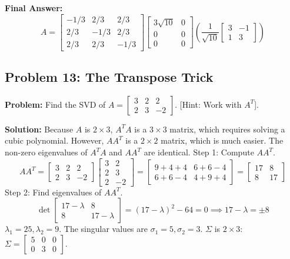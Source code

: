 \documentclass[11pt, letterpaper]{article}
\theoremstyle{definition}
\theoremstyle{remark}
\begin{document}
\textbf{Final Answer:}
\[
A = \begin{bmatrix} -1/3 & 2/3 & 2/3 \\ 2/3 & -1/3 & 2/3 \\ 2/3 & 2/3 & -1/3 \end{bmatrix} \begin{bmatrix} 3\sqrt{10} & 0 \\ 0 & 0 \\ 0 & 0 \end{bmatrix} \left( \frac{1}{\sqrt{10}} \begin{bmatrix} 3 & -1 \\ 1 & 3 \end{bmatrix} \right)
\]

\vspace{1em}
\subsection{Problem 13: The Transpose Trick}
\textbf{Problem:} Find the SVD of $A = \begin{bmatrix} 3 & 2 & 2 \\ 2 & 3 & -2 \end{bmatrix}$. [Hint: Work with $A^T$].

\textbf{Solution:}
Because $A$ is $2 \times 3$, $A^TA$ is a $3 \times 3$ matrix, which requires solving a cubic polynomial. However, $AA^T$ is a $2 \times 2$ matrix, which is much easier. The non-zero eigenvalues of $A^TA$ and $AA^T$ are identical.
Step 1: Compute $AA^T$.
\[
AA^T = \begin{bmatrix} 3 & 2 & 2 \\ 2 & 3 & -2 \end{bmatrix} \begin{bmatrix} 3 & 2 \\ 2 & 3 \\ 2 & -2 \end{bmatrix} = \begin{bmatrix} 9+4+4 & 6+6-4 \\ 6+6-4 & 4+9+4 \end{bmatrix} = \begin{bmatrix} 17 & 8 \\ 8 & 17 \end{bmatrix}
\]
Step 2: Find eigenvalues of $AA^T$.
\[
\det \begin{bmatrix} 17 - \lambda & 8 \\ 8 & 17 - \lambda \end{bmatrix} = (17 - \lambda)^2 - 64 = 0 \implies 17 - \lambda = \pm 8
\]
$\lambda_1 = 25, \lambda_2 = 9$. The singular values are $\sigma_1 = 5, \sigma_2 = 3$.
$\Sigma$ is $2 \times 3$: $\Sigma = \begin{bmatrix} 5 & 0 & 0 \\ 0 & 3 & 0 \end{bmatrix}$.
\end{document}
